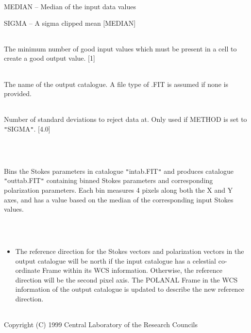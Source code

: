 \documentclass[twoside,11pt]{article}
\renewcommand{\_}{\texttt{\symbol{95}}}
\newlength{\sstexampleslength}
\newcommand{\sstexamples}[1]{
   \item[Examples:] \mbox{} \\
   \vspace{-3.5ex}
   \begin{description}
      #1
   \end{description}
}
\newcommand{\sstsubsection}[1]{ \item[{#1}] \mbox{} \\}
\newcommand{\sstexamplesubsection}[2]{\sloppy
\item[\parbox{\sstexampleslength}{\ssttt #1}] \mbox{} \vspace{1.0ex}
\\ #2 }
\newcommand{\sstnotes}[1]{\item[Notes:] \mbox{} \\[1.3ex] #1}
\newcommand{\sstdiytopic}[2]{\item[{\hspace{-0.35em}#1\hspace{-0.35em}:}]
\mbox{} \\[1.3ex] #2}
\newcommand{\sstitemlist}[1]{
  \mbox{} \\
  \vspace{-3.5ex}
  \begin{itemize}
     #1
  \end{itemize}
}
\newcommand{\sstitem}{\item}
\newcommand{\sstexamples}[1]{
      \item[Examples:] \\
      \begin{description}
         #1
      \end{description}
      \\
   }
\newcommand{\sstsubsection}[1]{\item[{#1}]}
\newcommand{\sstexamplesubsection}[2]{\item[{\ssttt #1}] #2}
\newcommand{\sstnotes}[1]{\item[Notes:] #1 }
\newcommand{\sstdiytopic}[2]{\item[{#1}] #2 }
\newcommand{\sstitemlist}[1]{
      \begin{itemize}
         #1
      \end{itemize}
      \\
   }
\newcommand{\sstitem}{\item}
\begin{document}
{{{{            \sstitem
               MEDIAN    -- Median of the input data values

            \sstitem
               SIGMA     -- A sigma clipped mean
            [MEDIAN]
         }
      }
      \sstsubsection{
         MINVAL = \_INTEGER (Read)
      }{
         The minimum number of good input values which must be present in
         a cell to create a good output value. [1]
      }
      \sstsubsection{
         OUT = LITERAL (Read)
      }{
         The name of the output catalogue. A file type of .FIT is assumed
         if none is provided.
      }
      \sstsubsection{
         SIGMAS = \_REAL (Read)
      }{
         Number of standard deviations to reject data at. Only used if
         METHOD is set to {\tt "}SIGMA{\tt "}. [4.0]
      }
   }
   \sstexamples{
      \sstexamplesubsection{
         polbin intab outtab 4
      }{
         Bins the Stokes parameters in catalogue {\tt "}intab.FIT{\tt "} and produces
         catalogue {\tt "}outtab.FIT{\tt "} containing binned Stokes parameters and
         corresponding polarization parameters. Each bin measures 4 pixels
         along both the X and Y axes, and has a value based on the median
         of the corresponding input Stokes values.
      }
   }
   \sstnotes{
      \sstitemlist{

         \sstitem
         The reference direction for the Stokes vectors and polarization
         vectors in the output catalogue will be north if the input catalogue
         has a celestial co-ordinate Frame within its WCS information. Otherwise,
         the reference direction will be the second pixel axis. The POLANAL
         Frame in the WCS information of the output catalogue is updated to
         describe the new reference direction.
      }
   }
   \sstdiytopic{
      Copyright
   }{
      Copyright (C) 1999 Central Laboratory of the Research Councils
   }
}
\end{document}
